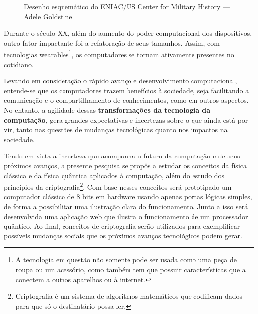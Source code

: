 \vspace{1cm}
\begin{figure}[H] \centering 
  \caption{\label{fig:2} Desenho esquemático do ENIAC/US Center for Military History —
  Adele Goldstine} 
\end{figure}


Durante o século XX, além do aumento do poder computacional dos dispositivos, outro fator impactante foi a refatoração de seus tamanhos. Assim, com tecnologias wearables\footnote{A tecnologia em questão não somente pode ser usada como uma peça de roupa ou um acessório, como também tem que possuir características que a conectem a outros aparelhos ou à internet.}, os computadores se tornam ativamente presentes no cotidiano.

Levando em consideração o rápido avanço e desenvolvimento computacional, entende-se que os computadores trazem benefícios à sociedade, seja facilitando a comunicação e o compartilhamento de conhecimentos, como em outros aspectos. No entanto, a agilidade dessas \textbf{transformações da tecnologia da computação}, gera grandes expectativas e incertezas sobre o que ainda está por vir, tanto nas questões de mudanças tecnológicas quanto nos impactos na sociedade.

Tendo em vista a incerteza que acompanha o futuro da computação e de seus próximos avanços, a presente pesquisa se propôs a estudar os conceitos da física clássica e da física quântica aplicados à computação, além do estudo dos princípios da criptografia\footnote{Criptografia é um sistema de algoritmos matemáticos que codificam dados para que só o destinatário possa ler.}. Com base nesses conceitos será prototipado um computador clássico de 8 bits em hardware usando apenas portas lógicas simples, de forma a possibilitar uma ilustração clara do funcionamento. Junto a isso será desenvolvida uma aplicação web que ilustra o funcionamento de um processador quântico. Ao final, conceitos de criptografia serão utilizados para exemplificar possíveis mudanças sociais que os próximos avanços tecnológicos podem gerar.

